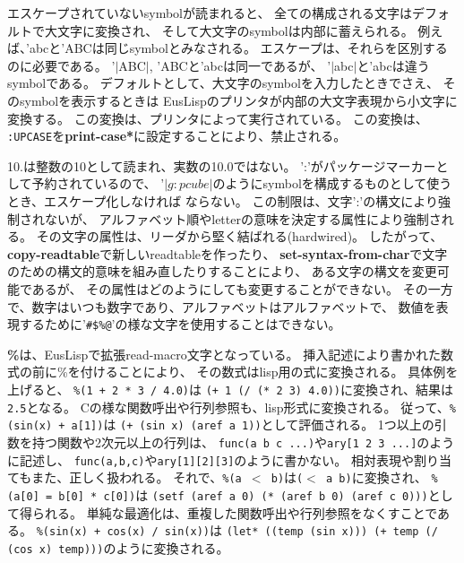 エスケープされていないsymbolが読まれると、
全ての構成される文字はデフォルトで大文字に変換され、
そして大文字のsymbolは内部に蓄えられる。
例えば、'abcと'ABCは同じsymbolとみなされる。
エスケープは、それらを区別するのに必要である。
'$|$ABC$|$, 'ABCと'abcは同一であるが、
'$|$abc$|$と'abcは違うsymbolである。
デフォルトとして、大文字のsymbolを入力したときでさえ、
そのsymbolを表示するときは
EusLispのプリンタが内部の大文字表現から小文字に変換する。
この変換は、プリンタによって実行されている。
この変換は、
{\tt :UPCASE}を{\bf *print-case*}に設定することにより、禁止される。

10.は整数の10として読まれ、実数の10.0ではない。
':'がパッケージマーカーとして予約されているので、
'$|g:pcube|$のようにsymbolを構成するものとして使うとき、エスケープ化しなければ
ならない。
この制限は、文字':'の構文により強制されないが、
アルファベット順やletterの意味を決定する属性により強制される。
その文字の属性は、リーダから堅く結ばれる(hardwired)。
したがって、{\bf copy-readtable}で新しいreadtableを作ったり、
{\bf set-syntax-from-char}で文字のための構文的意味を組み直したりすることにより、
ある文字の構文を変更可能であるが、
その属性はどのようにしても変更することができない。
その一方で、数字はいつも数字であり、アルファベットはアルファベットで、
数値を表現するために'{\tt \#\$\%@}'の様な文字を使用することはできない。

{\bf \%}は、EusLispで拡張read-macro文字となっている。
挿入記述により書かれた数式の前に\%を付けることにより、
その数式はlisp用の式に変換される。
具体例を上げると、
{\tt \%(1 + 2 * 3 / 4.0)}は
{\tt (+ 1 (/ (* 2 3) 4.0))}に変換され、結果は{\tt 2.5}となる。
Cの様な関数呼出や行列参照も、lisp形式に変換される。
従って、{\tt \%(sin(x) + a[1])}は
{\tt  (+ (sin x) (aref a 1))}として評価される。
1つ以上の引数を持つ関数や2次元以上の行列は、
{\tt func(a b c ...)}や{\tt ary[1 2 3 ...]}のように記述し、
{\tt func(a,b,c)}や{\tt ary[1][2][3]}のように書かない。
相対表現や割り当てもまた、正しく扱われる。
それで、{\tt \%(a $<$ b)}は{\tt ($<$ a b)}に変換され、
{\tt \%(a[0] = b[0] * c[0])}は 
{\tt (setf (aref a 0) (* (aref b 0) (aref c 0)))}として得られる。
単純な最適化は、重複した関数呼出や行列参照をなくすことである。
{\tt \%(sin(x) + cos(x) / sin(x))}は
{\tt (let* ((temp (sin x))) (+ temp (/ (cos x) temp)))}のように変換される。

